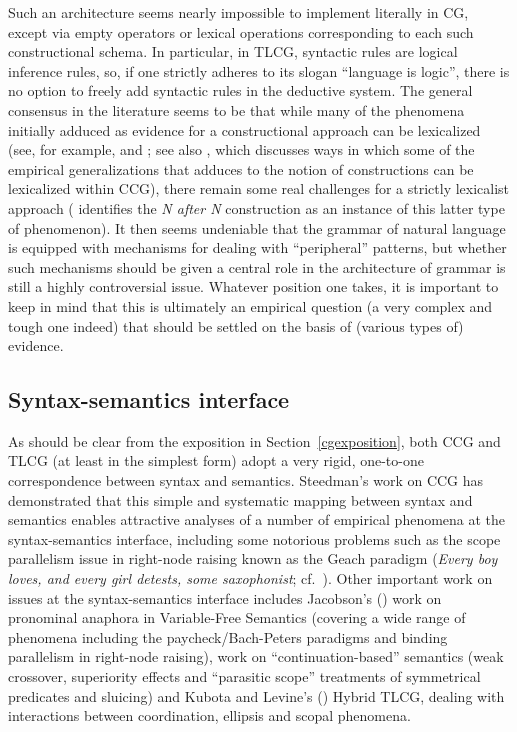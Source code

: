 \documentclass[output=paper
                ,modfonts
 	        ,biblatex
                ,babelshorthands
                ,newtxmath
                ,draftmode
                ,colorlinks, citecolor=brown
]{langscibook}
\begin{document}
Such an architecture seems nearly impossible to implement literally in
CG, except via empty operators or lexical operations corresponding to
each such constructional schema. In particular, in TLCG, syntactic
rules are logical inference rules, so, if one strictly adheres to its
slogan ``language is logic'', there is no option to freely add
syntactic rules in the deductive system. The general consensus in the
literature seems to be that while many of the phenomena initially
adduced as evidence for a constructional approach can be lexicalized
(see, for example, \citealt{MWArgSt} and ; see also
\citealt[202]{steedman2011ccg}, which discusses ways in which some of the
empirical generalizations that \citealt{Goldberg95a} adduces to the
notion of constructions can be lexicalized within CCG), there remain
some real challenges for a strictly lexicalist approach
( identifies the \textit{N after N}
construction as an instance of this latter type of phenomenon). It
then seems undeniable that the grammar of natural language is equipped with
mechanisms for dealing with ``peripheral'' patterns, but whether such
mechanisms should be given a central role in the architecture of
grammar is still a highly controversial issue. Whatever position one
takes, it is important to keep in mind that this is ultimately an
empirical question (a very complex and tough one indeed) that
should be settled on the basis of (various types of) evidence.



\subsection{Syntax-semantics interface }

As should be clear from the exposition in Section~\ref{cgexposition},
both CCG and TLCG (at 
least in the simplest form) adopt a very rigid, one-to-one
correspondence between syntax and semantics. Steedman's work on CCG
has demonstrated that 
this simple and systematic mapping between syntax and semantics
enables attractive analyses of
a number of empirical phenomena at the syntax-semantics interface,
including some notorious problems such as the scope parallelism issue
in right-node raising known as
the Geach paradigm (\textit{Every boy loves, and
every girl detests, some saxophonist}; cf.~\citealt[8]{Geach70a}). Other important work on issues
at the syntax-semantics interface includes Jacobson's
(\citeyear{Jacobson1999a,Jacobson2000a}) work on pronominal anaphora
in Variable-Free Semantics (covering a wide range of phenomena
including the paycheck/Bach-Peters paradigms and binding parallelism
in right-node raising),  work on ``continuation-based''
semantics (weak crossover, superiority effects and ``parasitic scope''
treatments of symmetrical predicates and sluicing) and Kubota and
Levine's
(\citeyear{kubota-levine-coord,kubota-levine-pseudo,KubotaLevineBook})
Hybrid TLCG, dealing with interactions between coordination, ellipsis and scopal
phenomena.
\end{document}
